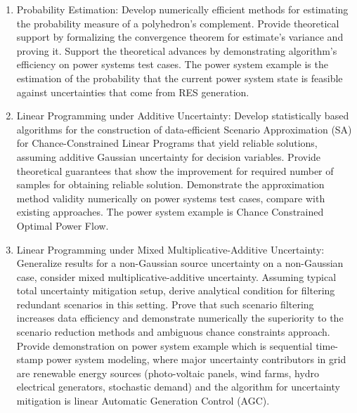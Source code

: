 \begin{enumerate}
    \item Probability Estimation: Develop numerically efficient methods for estimating the probability measure of a polyhedron's complement. Provide theoretical support by formalizing the convergence theorem for estimate's variance and proving it. Support the theoretical advances by demonstrating algorithm's efficiency on power systems test cases. The power system example is the estimation of the probability that the current power system state is feasible against uncertainties that come from RES generation.
    \item Linear Programming under Additive Uncertainty: Develop statistically based algorithms for the construction of data-efficient Scenario Approximation (SA) for Chance-Constrained Linear Programs that yield reliable solutions, assuming additive Gaussian uncertainty for decision variables. Provide theoretical guarantees that show the improvement for required number of samples for obtaining reliable solution. Demonstrate the approximation method validity numerically on power systems test cases, compare with existing approaches. The power system example is Chance Constrained Optimal Power Flow.
    \item Linear Programming under Mixed Multiplicative-Additive Uncertainty: Generalize results for a non-Gaussian source uncertainty on a non-Gaussian case, consider mixed multiplicative-additive uncertainty. Assuming typical total uncertainty mitigation setup, derive analytical condition for filtering redundant scenarios in this setting. Prove that such scenario filtering increases data efficiency and demonstrate numerically the superiority to the scenario reduction methods and ambiguous chance constraints approach. Provide demonstration on power system example which is sequential time-stamp power system modeling, where major uncertainty contributors in grid are renewable energy sources (photo-voltaic panels, wind farms, hydro electrical generators, stochastic demand) and the algorithm for uncertainty mitigation is linear Automatic Generation Control (AGC).
\end{enumerate}
